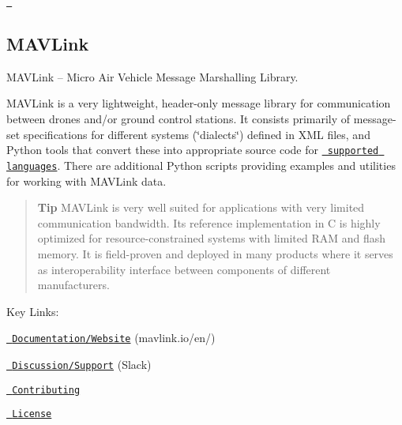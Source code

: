 \href{https://travis-ci.org/mavlink/mavlink}{\texttt{ }}

\subsection*{M\+A\+V\+Link}

M\+A\+V\+Link -- Micro Air Vehicle Message Marshalling Library.

M\+A\+V\+Link is a very lightweight, header-\/only message library for communication between drones and/or ground control stations. It consists primarily of message-\/set specifications for different systems (\char`\"{}dialects\char`\"{}) defined in X\+ML files, and Python tools that convert these into appropriate source code for \href{https://mavlink.io/en/\#supported_languages}{\texttt{ supported languages}}. There are additional Python scripts providing examples and utilities for working with M\+A\+V\+Link data.

\begin{quote}
{\bfseries{Tip}} M\+A\+V\+Link is very well suited for applications with very limited communication bandwidth. Its reference implementation in C is highly optimized for resource-\/constrained systems with limited R\+AM and flash memory. It is field-\/proven and deployed in many products where it serves as interoperability interface between components of different manufacturers. \end{quote}


Key Links\+:
\begin{DoxyItemize}
\item \href{https://mavlink.io/en/}{\texttt{ Documentation/\+Website}} (mavlink.\+io/en/)
\item \href{https://mavlink.io/en/\#support}{\texttt{ Discussion/\+Support}} (Slack)
\item \href{https://mavlink.io/en/contributing/contributing.html}{\texttt{ Contributing}}
\item \href{https://mavlink.io/en/\#license}{\texttt{ License}} 
\end{DoxyItemize}